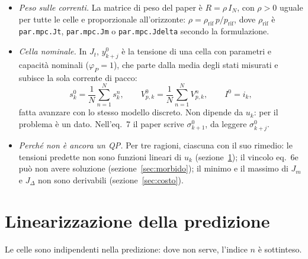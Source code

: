 \documentclass[11pt,a4paper]{article}
\newcommand{\ip}[1]{\textbf{(H#1)}}         %
\begin{document}
\begin{itemize}
\begin{align*}
        \end{align*}
  \item[\ip{10}] \emph{Peso sulle correnti.} La matrice di peso del paper è
        $R = \rho\, I_N$, con $\rho > 0$ uguale per tutte le celle e
        proporzionale all'orizzonte: $\rho = \rho_{\mathrm{rif}}\, p / p_{\mathrm{rif}}$,
        dove $\rho_{\mathrm{rif}}$ è \texttt{par.mpc.Jt}, \texttt{par.mpc.Jm} o
        \texttt{par.mpc.Jdelta} secondo la formulazione.
  \item[\ip{11}] \emph{Cella nominale.} In $J_t$, $y^0_{k+j}$ è la tensione di
        una cella con parametri e capacità nominali ($\varphi_P = 1$), che parte
        dalla media degli stati misurati e subisce la sola corrente di pacco:
        \[
          s^0_k = \frac1N \sum_{n=1}^{N} s^n_k , \qquad
          V^0_{p,k} = \frac1N \sum_{n=1}^{N} V^n_{p,k} , \qquad
          I^0 = i_k ,
        \]
        fatta avanzare con lo stesso modello discreto. Non dipende da $u_k$:
        per il problema è un dato. Nell'eq.~7 il paper scrive
        $\sigma^0_{k+1}$, da leggere $\sigma^0_{k+j}$.
  \item \emph{Perché non è ancora un QP.} Per tre ragioni, ciascuna con il
        suo rimedio: le tensioni predette non sono funzioni lineari di $u_k$
        (sezione~\ref{sec:lin}); il vincolo eq.~6e può non avere soluzione
        (sezione~\ref{sec:morbido}); il minimo e il massimo di $J_m$ e
        $J_\Delta$ non sono derivabili (sezione~\ref{sec:costo}).
\end{itemize}

\section{Linearizzazione della predizione}\label{sec:lin}

Le celle sono indipendenti nella predizione: dove non serve, l'indice $n$ è
sottinteso.
\end{document}
